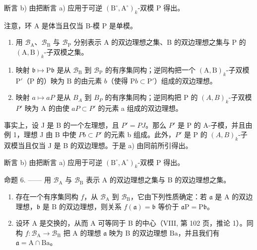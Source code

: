 断言 b) 由把断言 a) 应用于可逆 \((\mathrm{B}^{\circ},\mathrm{A}^{\circ})_{k}\)-双模 P 得出。

注意，环 A 是体当且仅当 B-模 P 是单模。

\begin{enumerate}
\def\labelenumi{\arabic{enumi})}
\setcounter{enumi}{1}
\tightlist
\item
  用 \(\mathcal{B}_{\mathrm{A}}\)、\(\mathcal{B}_{\mathrm{B}}\) 与 \(\mathcal{B}_{\mathrm{P}}\) 分别表示 A 的双边理想之集、B 的双边理想之集与 P 的 \((\mathrm{A},\mathrm{B})_k\)-子双模之集。
\end{enumerate}

\begin{enumerate}
\def\labelenumi{\alph{enumi})}
\item
  映射 \(\mathfrak{b} \mapsto \mathrm{P}\mathfrak{b}\) 是从 \(\mathcal{B}_{\mathrm{B}}\) 到 \(\mathcal{B}_{\mathrm{P}}\) 的有序集同构；逆同构把一个 \((\mathrm{A},\mathrm{B})_k\)-子双模 \(\mathrm{P}'\)（\(\mathrm{P}\) 的）映为 \(\mathrm{B}\) 的由元素 \(b\)（使得 \(\mathrm{P}b \subset \mathrm{P}'\)）组成的双边理想。
\item
  映射 \(a \mapsto aP\) 是从 \(B_{A}\) 到 \(B_{P}\) 的有序集同构；逆同构把 P 的 \((A, B)_{k}\)-子双模 \(P'\) 映为 A 的由使 \(aP \subset P'\) 的元素 a 组成的双边理想。
\end{enumerate}

事实上，设 J 是 B 的一个左理想，且 \(P' = PJ\)。那么 \(P'\) 是 P 的 A-子模，并且由例 1，理想 J 由 B 中使 \(Pb \subset P'\) 的元素 b 组成。此外，\(P'\) 是 P 的 \((A, B)_{k}\)-子双模当且仅当 J 是 B 的双边理想。于是 a) 由同前所引得出。

断言 b) 由把断言 a) 应用于可逆 \((\mathrm{B}^{\circ}, \mathrm{A}^{\circ})_{k}\)-双模 P 得出。

命题 6. —— 用 \(\mathcal{B}_{\mathrm{A}}\) 与 \(\mathcal{B}_{\mathrm{B}}\) 表示 A 的双边理想之集与 B 的双边理想之集。

\begin{enumerate}
\def\labelenumi{\alph{enumi})}
\item
  存在一个有序集同构 \(f\)，从 \(\mathcal{B}_{\mathrm{A}}\) 到 \(\mathcal{B}_{\mathrm{B}}\)，它由下列性质确定：若 \(\mathfrak{a}\) 是 \(\mathrm{A}\) 的双边理想，\(\mathfrak{b}\) 是 \(\mathrm{B}\) 的双边理想，则关系 \(f(\mathfrak{a}) = \mathfrak{b}\) 等价于 \(\mathfrak{a}\mathrm{P} = \mathrm{P}\mathfrak{b}\)。
\item
  设环 A 是交换的，从而 A 可等同于 B 的中心（VIII, 第 102 页，推论 1）。同构 \(f: \mathcal{B}_{\mathrm{A}} \to \mathcal{B}_{\mathrm{B}}\) 把 A 的理想 \(\mathfrak{a}\) 映为 B 的双边理想 \(\mathrm{Ba}\)，并且我们有 \(\mathfrak{a} = \mathrm{A} \cap \mathrm{Ba}\)。
\end{enumerate}

